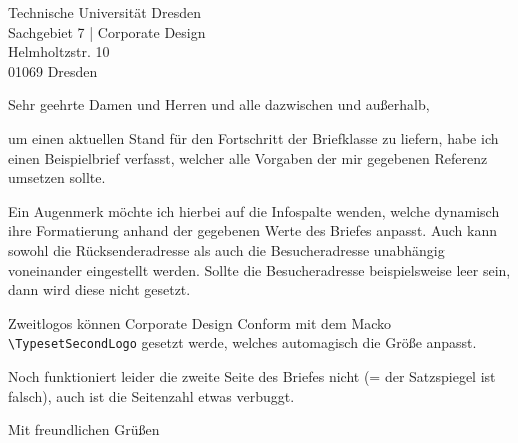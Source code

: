 \documentclass{tudcdlttr}
\begin{document}
\begin{letter}{
Technische Universität Dresden \\
Sachgebiet 7 | Corporate Design \\
Helmholtzstr. 10 \\
01069 Dresden}

\opening{Sehr geehrte Damen und Herren und alle dazwischen und außerhalb,}

um einen aktuellen Stand für den Fortschritt der Briefklasse zu liefern, habe ich einen
Beispielbrief verfasst, welcher alle Vorgaben der mir gegebenen Referenz umsetzen sollte.

Ein Augenmerk möchte ich hierbei auf die Infospalte wenden, welche dynamisch ihre Formatierung anhand der gegebenen Werte
des Briefes anpasst.
Auch kann sowohl die Rücksenderadresse als auch die Besucheradresse unabhängig voneinander
eingestellt werden. Sollte die Besucheradresse beispielsweise leer sein,
dann wird diese nicht gesetzt.

Zweitlogos können Corporate Design Conform mit dem Macko \verb|\TypesetSecondLogo| gesetzt werde, welches automagisch die Größe anpasst.

Noch funktioniert leider die zweite Seite des Briefes nicht (= der Satzspiegel ist falsch), auch ist die Seitenzahl etwas verbuggt.

\closing{Mit freundlichen Grüßen}


\end{letter}
\end{document}
